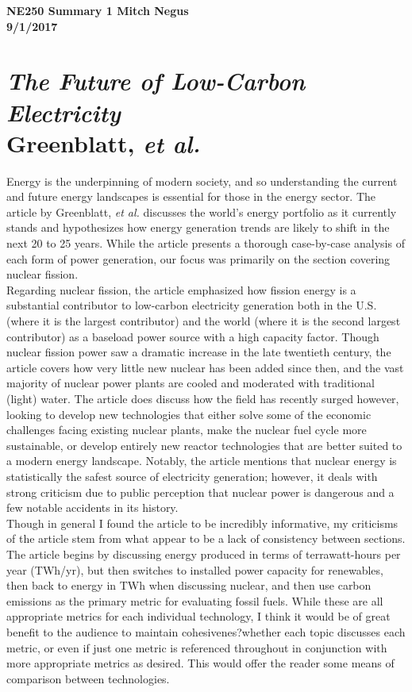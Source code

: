 \documentclass{report}
\newcommand{\tab}{\-\hspace{1cm}}
\begin{document}
\thispagestyle{empty}

{\bf {\large {NE250 Summary {1} \hfill Mitch Negus\\
		\hspace*{\fill} 9/1/2017\\ }}}
\section*{\textsl{The Future of Low-Carbon Electricity} \\ \normalsize Greenblatt, \textit{et al.}}

\tab Energy is the underpinning of modern society, and so understanding the current and future energy landscapes is essential for those in the energy sector. The article by Greenblatt, \textit{et al.} discusses the world's energy portfolio as it currently stands and hypothesizes how energy generation trends are likely to shift in the next 20 to 25 years. While the article presents a thorough case-by-case analysis of each form of power generation, our focus was primarily on the section covering nuclear fission.\\
\tab Regarding nuclear fission, the article emphasized how fission energy is a substantial contributor to low-carbon electricity generation both in the U.S. (where it is the largest contributor) and the world (where it is the second largest contributor) as a baseload power source with a high capacity factor. Though nuclear fission power saw a dramatic increase in the late twentieth century, the article covers how very little new nuclear has been added since then, and the vast majority of nuclear power plants are cooled and moderated with traditional (light) water. The article does discuss how the field has recently surged however, looking to develop new technologies that either solve some of the economic challenges facing existing nuclear plants, make the nuclear fuel cycle more sustainable, or develop entirely new reactor technologies that are better suited to a modern energy landscape. Notably, the article mentions that nuclear energy is statistically the safest source of electricity generation; however, it deals with strong criticism due to public perception that nuclear power is dangerous and a few notable accidents in its history. \\
\tab Though in general I found the article to be incredibly informative, my criticisms of the article stem from what appear to be a lack of consistency between sections. The article begins by discussing energy produced in terms of terrawatt-hours per year (TWh/yr), but then switches to installed power capacity for renewables, then back to energy in TWh when discussing nuclear, and then use carbon emissions as the primary metric for evaluating fossil fuels. While these are all appropriate metrics for each individual technology, I think it would be of great benefit to the audience to maintain cohesivenes?whether each topic discusses each metric, or even if just one metric is referenced throughout in conjunction with more appropriate metrics as desired. This would offer the reader some means of comparison between technologies.
\end{document}
